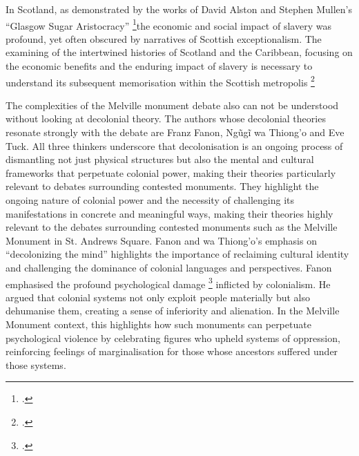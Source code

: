 \documentclass{scrartcl}
\renewcommand{\cite}{\parencite}
\begin{document}
In Scotland, as demonstrated by the works of David Alston \cite{alston_2021} and Stephen Mullen's ``Glasgow Sugar Aristocracy'' \footcite[``Perhaps so, but by including the substantial estates of merchants with principal interests in Mauritius, and others with no connection to Glasgow, Cooke’s estimations of the city’s West India merchant capital were inflated by including East India fortunes and returned sojourning wealth that improved other areas of Scotland''][p.24]{mullen_2021}the economic and social impact of slavery was profound, yet often obscured by narratives of Scottish exceptionalism. 
The examining of the intertwined histories of Scotland and the Caribbean, focusing on the economic benefits and the enduring impact of slavery is necessary to understand its subsequent memorisation within the Scottish metropolis \footcite[``Distinct from other European countries, Scotland was a stateless nation and therefore celebrated different types of heroes. Few monuments were dedicated to recent political leaders, and many more commemorated literary or historical figures.''][p.107]{godard_2018}

The complexities of the Melville monument debate also can not be understood without looking at decolonial theory.  The authors whose decolonial theories resonate strongly with the debate are Franz Fanon, Ngũgĩ wa Thiong'o and Eve Tuck. All three thinkers underscore that decolonisation is an ongoing process of dismantling not just physical structures but also the mental and cultural frameworks that perpetuate colonial power, making their theories particularly relevant to debates surrounding contested monuments. They highlight the ongoing nature of colonial power and the necessity of challenging its manifestations in concrete and meaningful ways, making their theories highly relevant to the debates surrounding contested monuments such as the Melville Monument in St. Andrews Square. Fanon and wa Thiong'o's emphasis on ``decolonizing the mind'' highlights the importance of reclaiming cultural identity and challenging the dominance of colonial languages and perspectives. Fanon emphasised the profound psychological damage \footcite[``Violence in the colonies does not only have for
its aim the keeping of these enslaved men at arm's length;
it seeks to dehumanize them. Everything will be done to
wipe out their traditions, to substitute our language for
theirs and to destroy their culture without giving them
ours.''][p.15]{fanon_wretched_2002} inflicted by colonialism. He argued that colonial systems not only exploit people materially but also dehumanise them, creating a sense of inferiority and alienation. In the Melville Monument context, this highlights how such monuments can perpetuate psychological violence by celebrating figures who upheld systems of oppression, reinforcing feelings of marginalisation for those whose ancestors suffered under those systems.
\end{document}
